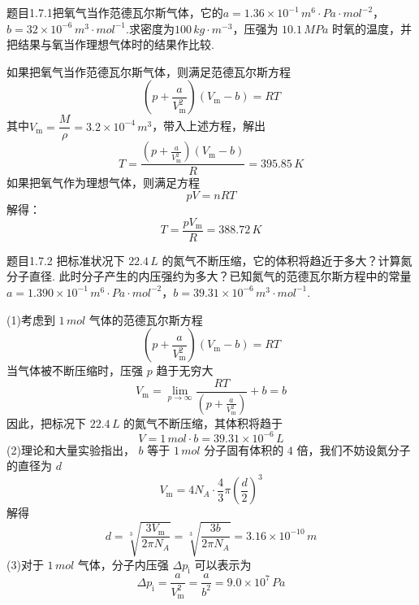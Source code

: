 \begin{question}{题目1.7.1}把氧气当作范德瓦尔斯气体，它的$a = 1.36\times10^{-1}\,\si{m^6 \cdot Pa \cdot mol^{-2}}$，$b = 32\times10^{-6}\,\si{m^3 \cdot mol^{-1}}$.求密度为$100\,\si{kg \cdot m^{-3}}$，压强为 $10.1\,\si{MPa}$ 时氧的温度，并把结果与氧当作理想气体时的结果作比较.
\end{question}
\begin{solution}
    如果把氧气当作范德瓦尔斯气体，则满足范德瓦尔斯方程
    $$
        \left(p+\frac{a}{V_\mathrm{m}^2}\right)\left(V_\mathrm{m}-b\right) = RT
    $$
    其中$V_\mathrm{m} = \dfrac{M}{\rho} = 3.2\times10^{-4} \,\si{m^3}$，带入上述方程，解出
    $$
        T
        = \frac{\left(p+\frac{a}{V_\mathrm{m}^2}\right)\left(V_\mathrm{m}-b\right)}{R}
        =395.85 \,\si{K}
    $$
    如果把氧气作为理想气体，则满足方程
    $$
        pV = nRT
    $$
    解得：
    $$
        T = \frac{pV_\mathrm{m}}{R} = 388.72 \,\si{K}
    $$
\end{solution}
\begin{question}{题目1.7.2}
    把标准状况下 $22.4 \,\si{L}$ 的氮气不断压缩，它的体积将趋近于多大？计算氮分子直径. 此时分子产生的内压强约为多大？已知氮气的范德瓦尔斯方程中的常量$a=1.390 \times 10^{-1} \,\si{m^6 \cdot Pa \cdot mol^{-2}}$，$b=39.31 \times 10^{-6}\,\si{m^3 \cdot mol^{-1}}$.
\end{question}
\begin{solution}
    (1)考虑到 $1 \,\si{mol}$ 气体的范德瓦尔斯方程
    $$
        \left(p+\frac{a}{V_\mathrm{m}^2}\right)\left(V_\mathrm{m}-b\right)=RT
    $$
    当气体被不断压缩时，压强 $p$ 趋于无穷大
    $$
        V_\mathrm{m} = \lim\limits_{p \to \infty} \frac{RT}{\left(p+\frac{a}{V_\mathrm{m}^2}\right)} + b = b
    $$
    因此，把标况下 $22.4 \,\si{L}$ 的氮气不断压缩，其体积将趋于
    $$
        V = 1 \,\si{mol} \cdot b = 39.31 \times 10^{-6} \,\si{L}
    $$
    (2)理论和大量实验指出， $b$ 等于 $1\,\si{mol}$ 分子固有体积的 $4$ 倍，我们不妨设氮分子的直径为 $d$
    $$
        V_\mathrm{m} = 4 N_A \cdot \frac{4}{3}\pi\left(\frac{d}{2}\right)^3
    $$
    解得
    $$
        d = \sqrt[3]{\frac{3V_\mathrm{m}}{2 \pi N_A}} = \sqrt[3]{\frac{3b}{2 \pi N_A}} = 3.16 \times 10 ^{-10} \,\si{m}
    $$
    (3)对于 $1 \,\si{mol}$ 气体，分子内压强 $\Delta p_\mathrm{i}$ 可以表示为
    $$
        \Delta p_\mathrm{i}
        = \frac{a}{V_\mathrm{m}^2}
        = \frac{a}{b^2}
        = 9.0 \times 10^{7} \,\si{Pa}
    $$
\end{solution}